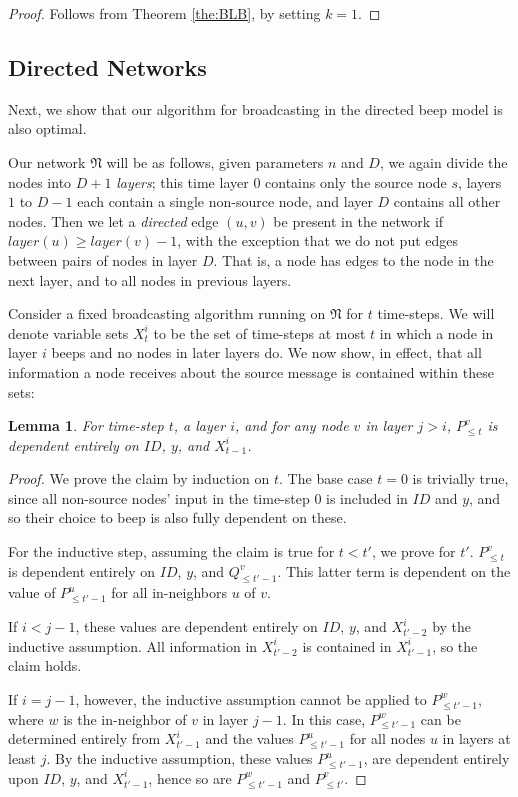 \documentclass{article}
\newtheorem{lemma}[theorem]{Lemma}
\newcommand{\net}{\ensuremath{\mathfrak{N}}\xspace}
\begin{document}
\begin{proof}
	Follows from Theorem \ref{the:BLB}, by setting $k=1$.
\end{proof}

\subsection{Directed Networks}

Next, we show that our algorithm for broadcasting in the directed beep model is also optimal.

Our network $\net$ will be as follows, given parameters $n$ and $D$, we again divide the nodes into $D+1$ \emph{layers}; this time layer $0$ contains only the source node $s$, layers $1$ to $D-1$ each contain a single non-source node, and layer $D$ contains all other nodes. Then we let a \emph{directed} edge $(u,v)$ be present in the network if $layer(u) \ge layer(v) - 1$, with the exception that we do not put edges between pairs of nodes in layer $D$. That is, a node has edges to the node in the next layer, and to all nodes in previous layers.

Consider a fixed broadcasting algorithm running on $\net$ for $t$ time-steps. We will denote variable sets $X^i_t$ to be the set of time-steps at most $t$ in which a node in layer $i$ beeps and no nodes in later layers do. We now show, in effect, that all information a node receives about the source message is contained within these sets:

\begin{lemma}\label{lem:indy}
	For time-step $t$, a layer $i$, and for any node $v$ in layer $j > i$, $P^v_{\leq t}$ is dependent entirely on $ID$, $y$, and $X^{i}_{t-1}$.
\end{lemma}

\begin{proof}
	We prove the claim by induction on $t$. The base case $t=0$ is trivially true, since all non-source nodes' input in the time-step $0$ is included in $ID$ and $y$, and so their choice to beep is also fully dependent on these.
	
	For the inductive step, assuming the claim is true for $t<t'$, we prove for $t'$. $P^v_{\leq t}$ is dependent entirely on $ID$, $y$, and $Q^v_{\leq t'-1}$. This latter term is dependent on the value of $P^u_{\leq t'-1}$ for all in-neighbors $u$ of $v$.
	
	If $i<j-1$,  these values are dependent entirely on $ID$, $y$, and $X^{i}_{t'-2}$ by the inductive assumption. All information in $X^{i}_{t'-2}$ is contained in $X^{i}_{t'-1}$, so the claim holds.
	
	If $i=j-1$, however, the inductive assumption cannot be applied to $P^w_{\leq t'-1}$, where $w$ is the in-neighbor of $v$ in layer $j-1$. In this case, $P^w_{\leq t'-1}$ can be determined entirely from $X^{i}_{t'-1}$ and the values $P^u_{\leq t'-1}$ for all nodes $u$ in layers at least $j$. By the inductive assumption, these values $P^u_{\leq t'-1}$, are dependent entirely upon $ID$, $y$, and $X^{i}_{t'-1}$, hence so are $P^w_{\leq t'-1}$ and $P^v_{\leq t'}$.
\end{proof}
\end{document}
